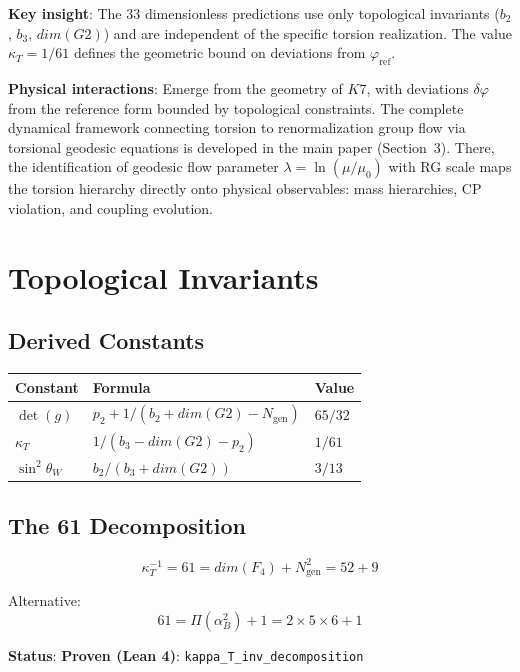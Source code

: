 \documentclass[11pt,a4paper]{article}
\newcommand{\Gtwo}{\mathrm{G}_2}
\newcommand{\Kseven}{K_7}
\newcommand{\dimE}{\mathrm{dim}}
\newcommand{\proven}{\textsc{Proven}}
\def\Gtwo{G2}%
\def\Kseven{K7}%
\def\dimE{dim}%
\def\proven{Proven}%
\begin{document}
\textbf{Key insight}: The 33 dimensionless predictions use only topological invariants ($b_2$, $b_3$, $\dimE(\Gtwo)$) and are independent of the specific torsion realization. The value $\kappa_T = 1/61$ defines the geometric bound on deviations from $\varphi_{\text{ref}}$.

\textbf{Physical interactions}: Emerge from the geometry of $\Kseven$, with deviations $\delta\varphi$ from the reference form bounded by topological constraints. The complete dynamical framework connecting torsion to renormalization group flow via torsional geodesic equations is developed in the main paper (Section~3). There, the identification of geodesic flow parameter $\lambda = \ln(\mu/\mu_0)$ with RG scale maps the torsion hierarchy directly onto physical observables: mass hierarchies, CP violation, and coupling evolution.

\section{Topological Invariants}

\subsection{Derived Constants}

\begin{table}[H]
\centering
\begin{tabular}{lll}
\toprule
Constant & Formula & Value \\
\midrule
$\det(g)$ & $p_2 + 1/(b_2 + \dimE(\Gtwo) - N_{\mathrm{gen}})$ & $65/32$ \\
$\kappa_T$ & $1/(b_3 - \dimE(\Gtwo) - p_2)$ & $1/61$ \\
$\sin^2\theta_W$ & $b_2/(b_3 + \dimE(\Gtwo))$ & $3/13$ \\
\bottomrule
\end{tabular}
\end{table}

\subsection{The 61 Decomposition}

$$\kappa_T^{-1} = 61 = \dimE(F_4) + N_{\mathrm{gen}}^2 = 52 + 9$$

Alternative:
$$61 = \Pi(\alpha_B^2) + 1 = 2 \times 5 \times 6 + 1$$

\textbf{Status}: \textbf{\proven{} (Lean 4)}: \texttt{kappa\_T\_inv\_decomposition}
\end{document}
